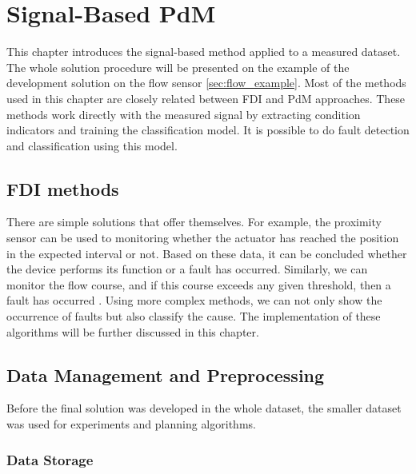 %




\chapter{Signal-Based PdM}\label{ch:sb}
This chapter introduces the signal-based method applied to a measured
dataset.  The whole solution procedure will be presented on the example of
the development solution on the flow sensor \ref{sec:flow_example}.  Most
of the methods used in this chapter are closely related between FDI and PdM
approaches. These methods work directly with the measured signal by
extracting condition indicators and training the classification model. It
is possible to do fault detection and classification using this model.


\section{FDI methods}\label{sec:easy_fdi}
There are simple solutions that offer themselves. For example, the
proximity sensor can be used to monitoring whether the actuator has reached
the position in the expected interval or not. Based on these data, it can
be concluded whether the device performs its function or a fault has
occurred.  Similarly, we can monitor the flow course, and if this course
exceeds any given threshold, then a fault has occurred \cite{isermann_fdi}.
Using more complex methods, we can not only show the occurrence of faults
but also classify the cause. The implementation of these algorithms will be
further discussed in this chapter.

\section{Data Management and Preprocessing}
Before the final solution was developed in the whole dataset, the smaller
dataset was used for experiments and planning algorithms. 

\subsection{Data Storage}
